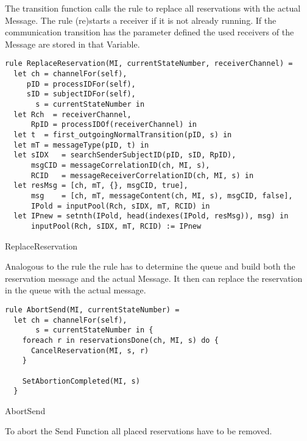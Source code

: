 The transition function calls the  rule to replace all
reservations with the actual Message. The  rule
(re)starts a receiver if it is not already running.
If the communication transition has the parameter  defined
the used receivers of the Message are stored in that Variable.


\begin{listing}[H]
\begin{verbatim}
rule ReplaceReservation(MI, currentStateNumber, receiverChannel) =
  let ch = channelFor(self),
     pID = processIDFor(self),
     sID = subjectIDFor(self),
       s = currentStateNumber in
  let Rch  = receiverChannel,
      RpID = processIDOf(receiverChannel) in
  let t  = first_outgoingNormalTransition(pID, s) in
  let mT = messageType(pID, t) in
  let sIDX   = searchSenderSubjectID(pID, sID, RpID),
      msgCID = messageCorrelationID(ch, MI, s),
      RCID   = messageReceiverCorrelationID(ch, MI, s) in
  let resMsg = [ch, mT, {}, msgCID, true],
      msg    = [ch, mT, messageContent(ch, MI, s), msgCID, false],
      IPold = inputPool(Rch, sIDX, mT, RCID) in
  let IPnew = setnth(IPold, head(indexes(IPold, resMsg)), msg) in
      inputPool(Rch, sIDX, mT, RCID) := IPnew
\end{verbatim}
\caption{ReplaceReservation}
\label{lst:shortasm:ReplaceReservation}
\end{listing}


Analogous to the  rule the
 rule has to determine the queue and build both
the reservation message and the actual Message. It then can replace the reservation
in the queue with the actual message.


\begin{listing}[H]
\begin{verbatim}
rule AbortSend(MI, currentStateNumber) =
  let ch = channelFor(self),
       s = currentStateNumber in {
    foreach r in reservationsDone(ch, MI, s) do {
      CancelReservation(MI, s, r)
    }

    SetAbortionCompleted(MI, s)
  }
\end{verbatim}
\caption{AbortSend}
\label{lst:shortasm:AbortSend}
\end{listing}


To abort the Send Function all placed reservations have to be removed.


